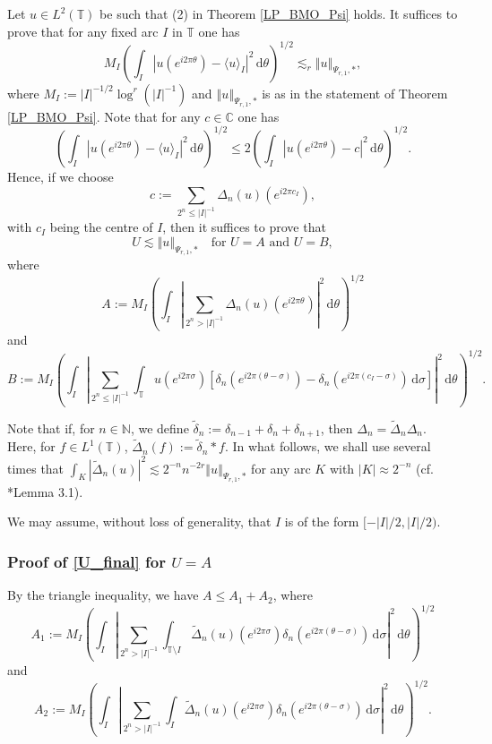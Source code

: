 \documentclass[a4paper, leqno, 10pt]{amsart}
\numberwithin{equation}{section}
\newcommand{\dd}{\mathrm{d}}
\newcommand{\T}{\mathbb{T}}
\newcommand{\norm}[1]{\left\Vert#1\right\Vert}
\newcommand{\abs}[1]{\left|#1\right|}
\newcommand{\C}{\mathbb{C}}
\newcommand{\N}{\mathbb{N}}
\begin{document}
Let $u \in L^2 (\T)$ be such that (2) in Theorem \ref{LP_BMO_Psi} holds. It suffices to prove that for any fixed arc $I$ in $\T$ one has
\begin{equation}\label{main_est_1_implies_2_I}
M_I \left( \int_I \abs{ u (e^{i 2 \pi \theta}) - \langle u \rangle_I }^2 \, \dd \theta \right)^{1/2} \lesssim_r \norm{u}_{\Psi_{r,1}, \ast} ,
\end{equation}
where  $M_I := |I|^{-1/2} \log^r ( |I|^{-1} )$ and $\norm{u}_{\Psi_{r,1}, \ast}$ is as in the statement of Theorem \ref{LP_BMO_Psi}. Note that for any $c \in \C$ one has
\[ 
\left( \int_I \abs{ u (e^{i 2 \pi \theta}) - \langle u \rangle_I }^2 \, \dd \theta \right)^{1/2} \leq  2 \left( \int_I \abs{ u (e^{i 2 \pi \theta}) - c }^2 \, \dd \theta \right)^{1/2} .
\]
Hence, if we choose
\[
c:= \sum_{ 2^n \leq | I |^{-1} }  \Delta_n (u) (e^{i 2 \pi c_I}),
\]
with $c_I$ being the centre of $I$, then it suffices to prove that
\begin{equation}\label{U_final}
U  \lesssim \norm{u}_{\Psi_{r,1}, \ast} \quad \text{for } U = A \text{ and } U=B,
\end{equation}
where
\[
A:= M_I \left( \int_I \abs{ \sum_{ 2^n > | I |^{-1} } \Delta_n (u) (e^{i 2 \pi \theta}) }^2 \, \dd \theta \right)^{1/2} 
\]
and
\[
B:= M_I \left( \int_I \abs{ \sum_{ 2^n \leq | I |^{-1} }  \int_{\T} u (e^{i 2 \pi \sigma}) \left[  \delta_n \left( e^{i 2 \pi (\theta - \sigma ) } \right) - \delta_n \left(  e^{i 2 \pi (c_I - \sigma) } \right)  \, \dd \sigma \right] }^2 \, \dd \theta \right)^{1/2} .
\]

Note that if, for $n \in \N$, we define $ \widetilde{\delta}_n := \delta_{n-1}+\delta_n + \delta_{n+1} $, then  $\Delta_n = \widetilde{\Delta}_n \Delta_n $. Here, for $f \in L^1 (\T)$, $ \widetilde{\Delta}_n  (f) := \widetilde{\delta}_n \ast f $. In what follows, we shall use several times that  $\int_K |\widetilde{\Delta}_n  (u) |^2 \lesssim 2^{-n} n^{-2r} \norm{u}_{\Psi_{r,1}, \ast}$ for any arc $K$ with $|K| \approx2^{-n}$  (cf. \cite{V-T}*{Lemma 3.1}). 

We may assume, without loss of generality, that $I$ is of the form $[-|I|/2,|I|/2)$.

%
\subsubsection{Proof of \eqref{U_final} for $U=A$}
%
By the triangle inequality, we have $A \leq A_1 + A_2$,
where
\[
A_1 := M_I \left( \int_I \abs{ \sum_{ 2^n > | I |^{-1} }  \int_{\T \setminus I} \widetilde{\Delta}_n (u) (e^{i 2 \pi \sigma}) \delta_n \left( e^{i 2 \pi (\theta - \sigma )  }   \right) \, \dd \sigma  }^2  \, \dd \theta \right)^{1/2} 
\]
and
\[
A_2 := M_I \left( \int_I \abs{  \sum_{ 2^n > | I |^{-1} } \int_I \widetilde{\Delta}_n (u) (e^{i 2 \pi \sigma}) \delta_n \left( e^{i 2 \pi (\theta - \sigma )  } \right)   \, \dd \sigma  }^2 \, \dd \theta \right)^{1/2} .
\]
%
\end{document}
